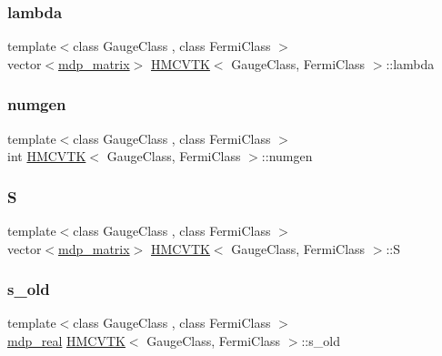 \mbox{\label{class_h_m_c_v_t_k_ae84586a5a07180518b7d0eacf2a90265}} 
\subsubsection{\texorpdfstring{lambda}{lambda}}
{\footnotesize\ttfamily template$<$class Gauge\+Class , class Fermi\+Class $>$ \\
vector$<$\hyperlink{classmdp__matrix}{mdp\+\_\+matrix}$>$ \hyperlink{class_h_m_c_v_t_k}{H\+M\+C\+V\+TK}$<$ Gauge\+Class, Fermi\+Class $>$\+::lambda}

\mbox{\label{class_h_m_c_v_t_k_a881b6b88d434759d784a66eab366a6fd}} 
\subsubsection{\texorpdfstring{numgen}{numgen}}
{\footnotesize\ttfamily template$<$class Gauge\+Class , class Fermi\+Class $>$ \\
int \hyperlink{class_h_m_c_v_t_k}{H\+M\+C\+V\+TK}$<$ Gauge\+Class, Fermi\+Class $>$\+::numgen}

\mbox{\label{class_h_m_c_v_t_k_a3462cb4648e6c2994fc69d1f709858ef}} 
\subsubsection{\texorpdfstring{S}{S}}
{\footnotesize\ttfamily template$<$class Gauge\+Class , class Fermi\+Class $>$ \\
vector$<$\hyperlink{classmdp__matrix}{mdp\+\_\+matrix}$>$ \hyperlink{class_h_m_c_v_t_k}{H\+M\+C\+V\+TK}$<$ Gauge\+Class, Fermi\+Class $>$\+::S}

\mbox{\label{class_h_m_c_v_t_k_a73b3049364eea7f9f0b57594ef48dbf6}} 
\subsubsection{\texorpdfstring{s\+\_\+old}{s\_old}}
{\footnotesize\ttfamily template$<$class Gauge\+Class , class Fermi\+Class $>$ \\
\hyperlink{mdp__global__vars_8h_a69d96b74c791e0bbdb888b3913a69450}{mdp\+\_\+real} \hyperlink{class_h_m_c_v_t_k}{H\+M\+C\+V\+TK}$<$ Gauge\+Class, Fermi\+Class $>$\+::s\+\_\+old}

